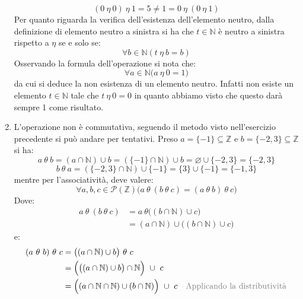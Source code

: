 \begin{enumerate}
	\begin{displaymath}
		(0 \ \eta \ 0) \ \eta \ 1 = 5 \neq 1 = 0 \ \eta \ (0 \ \eta \ 1)
	\end{displaymath}
	Per quanto riguarda la verifica dell'esistenza dell'elemento neutro, dalla definizione di elemento neutro a sinistra si ha che $t \in \mathbb{N}$ è neutro a sinistra rispetto a $\eta$ se e solo se:
	\begin{displaymath}
		\forall b \in \mathbb{N} (t \ \eta \ b = b)
	\end{displaymath}
	Osservando la formula dell'operazione si nota che:
	\begin{displaymath}
		\forall a \in \mathbb{N} \bigl( a \ \eta \ 0 = 1 \bigr)
	\end{displaymath}
	da cui si deduce la non esistenza di un elemento neutro. Infatti non esiste un elemento $t \in \mathbb{N}$ tale che $t \ \eta \ 0 = 0$ in quanto abbiamo visto che questo darà sempre 1 come risultato.
	\item L'operazione non è commutativa, seguendo il metodo visto nell'esercizio precedente si può andare per tentativi. Preso $a=\{-1\}\subseteq \mathbb{Z}$ e $b=\{-2,3\}\subseteq \mathbb{Z}$ si ha:
	\begin{displaymath}
		a \ \theta \ b = (a \cap \mathbb{N}) \cup b = (\{-1\}\cap \mathbb{N})\cup b = \varnothing \cup \{-2,3\} = \{-2,3\}
	\end{displaymath}
	\begin{displaymath}
		b \ \theta \ a = (\{-2,3\} \cap \mathbb{N}) \cup \{-1\} = \{3\} \cup \{-1\} = \{-1,3\}
	\end{displaymath}
	mentre per l'associatività, deve valere:
	\begin{displaymath}
		\forall a,b,c \in \mathcal{P}(\mathbb{Z})\bigl( a \ \theta \ (b \ \theta \ c) = (a \ \theta \ b) \ \theta \ c \bigr)
	\end{displaymath}
	Dove:
	\begin{align*}
		a \ \theta \ (b \ \theta \ c) &= a \ \theta \bigl( (b \cap \mathbb{N}) \cup c \bigr) \\
		&= (a \cap \mathbb{N}) \cup \bigl( (b \cap \mathbb{N}) \cup c \bigr)
	\end{align*}
	e:
	\begin{align*}
		(a \ \theta \ b) \ \theta \ c &= \bigl((a \cap \mathbb{N}) \cup b\bigr) \ \theta \ c \\
		&= \Bigl( \bigl((a \cap \mathbb{N}) \cup b\bigr) \cap \mathbb{N} \Bigr) \ \cup \ c \\
		&= \Bigl((a \cap \mathbb{N} \cap \mathbb{N}) \cup (b \cap \mathbb{N} )\Bigr) \ \cup \ c & \text{\textcolor{gray}{Applicando la distributività}} \\

\end{align*}
\end{enumerate}
